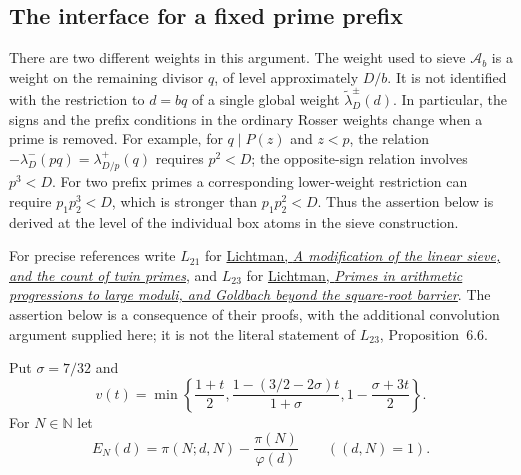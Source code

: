 
\subsection{The interface for a fixed prime prefix}
\label{sec:prefix-interface}

There are two different weights in this argument. The weight used to
sieve $\mathcal A_b$ is a weight on the remaining divisor $q$, of level
approximately $D/b$. It is not identified with the restriction to
$d=bq$ of a single global weight $\widetilde\lambda_D^{\pm}(d)$.
In particular, the signs and the prefix conditions in the ordinary
Rosser weights change when a prime is removed. For example, for
$q\mid P(z)$ and $z<p$, the relation
$-\lambda_D^-(pq)=\lambda_{D/p}^+(q)$ requires $p^2<D$;
the opposite-sign relation involves $p^3<D$.
For two prefix primes a corresponding lower-weight restriction
can require $p_1p_2^3<D$, which is stronger than
$p_1p_2^2<D$. Thus the assertion below is derived at the level of
the individual box atoms in the sieve construction.

For precise references write $L_{21}$ for
\href{https://arxiv.org/pdf/2109.02851v2}{Lichtman,
\emph{A modification of the linear sieve, and the count of twin primes}},
and $L_{23}$ for
\href{https://arxiv.org/pdf/2309.08522v1}{Lichtman,
\emph{Primes in arithmetic progressions to large moduli, and Goldbach
beyond the square-root barrier}}.
The assertion below is a consequence of their proofs, with the
additional convolution argument supplied here; it is not the literal
statement of $L_{23}$, Proposition~6.6.

Put $\sigma=7/32$ and
\begin{equation}\label{eq:prefix-v}
 v(t)=\min\left\{\frac{1+t}{2},
       \frac{1-(3/2-2\sigma)t}{1+\sigma},
       1-\frac{\sigma+3t}{2}\right\}.
\end{equation}
For $N\in\mathbb N$ let
\[
 E_N(d)=\pi(N;d,N)-\frac{\pi(N)}{\varphi(d)}
 \qquad ((d,N)=1).
\]

